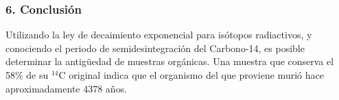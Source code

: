 \subsubsection*{6. Conclusión}
\begin{cajaconclusion}
Utilizando la ley de decaimiento exponencial para isótopos radiactivos, y conociendo el periodo de semidesintegración del Carbono-14, es posible determinar la antigüedad de muestras orgánicas. Una muestra que conserva el 58\% de su $^{14}\text{C}$ original indica que el organismo del que proviene murió hace aproximadamente 4378 años.
\end{cajaconclusion}

\newpage